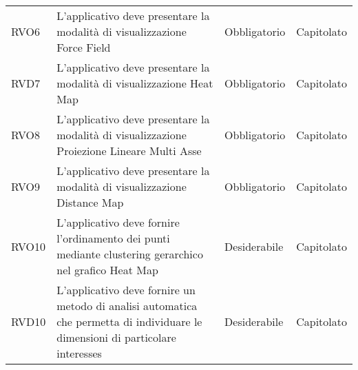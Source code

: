 \begin{longtable}[H]{|>{\raggedright\arraybackslash}p{20mm} | p{90mm} | p{22mm} | p{30mm} |}
    RVO6
        & L'applicativo deve presentare la modalità di visualizzazione Force Field
        & Obbligatorio
        & Capitolato \\
    
    RVD7
        & L'applicativo deve presentare la modalità di visualizzazione Heat Map
        & Obbligatorio
        & Capitolato \\
    
    RVO8
        & L'applicativo deve presentare la modalità di visualizzazione Proiezione Lineare Multi Asse
        & Obbligatorio
        & Capitolato \\

    RVO9
        & L'applicativo deve presentare la modalità di visualizzazione Distance Map
        & Obbligatorio
        & Capitolato \\

    RVO10
        & L'applicativo deve fornire l'ordinamento dei punti mediante clustering gerarchico nel grafico Heat Map
        & Desiderabile
        & Capitolato \\

    RVD10
        & L'applicativo deve fornire un metodo di analisi automatica che permetta di individuare le dimensioni di particolare interesses
        & Desiderabile
        & Capitolato \\

\end{longtable}
